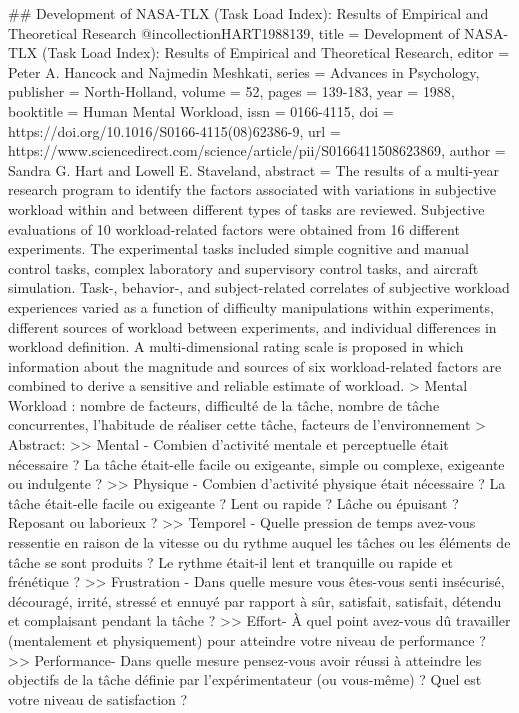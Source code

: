 	## Development of NASA-TLX (Task Load Index): Results of Empirical and Theoretical Research
	@incollection{HART1988139,
		title = {Development of NASA-TLX (Task Load Index): Results of Empirical and Theoretical Research},
		editor = {Peter A. Hancock and Najmedin Meshkati},
		series = {Advances in Psychology},
		publisher = {North-Holland},
		volume = {52},
		pages = {139-183},
		year = {1988},
		booktitle = {Human Mental Workload},
		issn = {0166-4115},
		doi = {https://doi.org/10.1016/S0166-4115(08)62386-9},
		url = {https://www.sciencedirect.com/science/article/pii/S0166411508623869},
		author = {Sandra G. Hart and Lowell E. Staveland},
		abstract = {The results of a multi-year research program to identify the factors associated with variations in subjective workload within and between different types of tasks are reviewed. Subjective evaluations of 10 workload-related factors were obtained from 16 different experiments. The experimental tasks included simple cognitive and manual control tasks, complex laboratory and supervisory control tasks, and aircraft simulation. Task-, behavior-, and subject-related correlates of subjective workload experiences varied as a function of difficulty manipulations within experiments, different sources of workload between experiments, and individual differences in workload definition. A multi-dimensional rating scale is proposed in which information about the magnitude and sources of six workload-related factors are combined to derive a sensitive and reliable estimate of workload.}
	}
	> Mental Workload : nombre de facteurs, difficulté de la tâche, nombre de tâche concurrentes, l'habitude de réaliser cette tâche, facteurs de l'environnement
	> Abstract:
		>> Mental - Combien d'activité mentale et perceptuelle était nécessaire ? La tâche était-elle facile ou exigeante, simple ou complexe, exigeante ou indulgente ?
		>> Physique - Combien d'activité physique était nécessaire ? La tâche était-elle facile ou exigeante ? Lent ou rapide ? Lâche ou épuisant ? Reposant ou laborieux ?
		>> Temporel - Quelle pression de temps avez-vous ressentie en raison de la vitesse ou du rythme auquel les tâches ou les éléments de tâche se sont produits ? Le rythme était-il lent et tranquille ou rapide et frénétique ?
		>> Frustration - Dans quelle mesure vous êtes-vous senti insécurisé, découragé, irrité, stressé et ennuyé par rapport à sûr, satisfait, satisfait, détendu et complaisant pendant la tâche ?
		>> Effort- À quel point avez-vous dû travailler (mentalement et physiquement) pour atteindre votre niveau de performance ?
		>> Performance- Dans quelle mesure pensez-vous avoir réussi à atteindre les objectifs de la tâche définie par l'expérimentateur (ou vous-même) ? Quel est votre niveau de satisfaction ?
	

